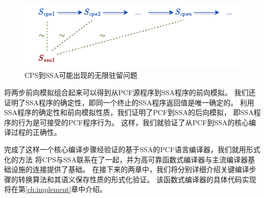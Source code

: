 \begin{figure}[htbp]
    \centering
    \vspace{2ex}
    \includegraphics[width=0.75\linewidth]{figures/stutter.drawio.pdf}
    \caption{CPS到SSA可能出现的无限驻留问题}\label{stutter}
\end{figure}

将两步前向模拟组合起来可以得到从PCF源程序到SSA程序的前向模拟。
我们还证明了SSA程序的确定性，即同一个终止的SSA程序返回值是唯一确定的。
利用SSA程序的确定性和前向模拟性质，我们证明了PCF到SSA的后向模拟，
即SSA程序的行为是可接受的PCF程序行为。
这样，我们就验证了从PCF到SSA的核心编译过程的正确性。

完成了这样一个核心编译步骤经验证的基于SSA的PCF语言编译器，我们就用形式化的方法
将CPS与SSA联系在了一起，并为高可靠函数式编译器与主流编译器基础设施的连接提供了基础。
在接下来的两章中，我们将分别详细介绍关键编译步骤的转换算法和其语义保存性质的形式化验证。
该函数式编译器的具体代码实现将在第\ref{ch:implement}章中介绍。